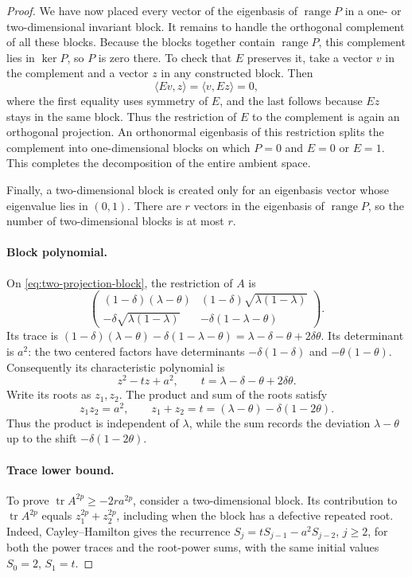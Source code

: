\documentclass[11pt]{article}
\theoremstyle{definition}
\theoremstyle{remark}
\theoremstyle{plain}
\DeclareMathOperator{\tr}{tr}
\begin{document}
\begin{proof}
We have now placed every vector of the eigenbasis of
\(\operatorname{range}P\) in a one- or two-dimensional invariant block.
It remains to handle the orthogonal complement of all these blocks.
Because the blocks together contain \(\operatorname{range}P\),
this complement lies in \(\ker P\), so \(P\) is zero there.
To check that \(E\) preserves it, take a vector \(v\) in the complement
and a vector \(z\) in any constructed block. Then
\[
 \langle Ev,z\rangle=\langle v,Ez\rangle=0,
\]
where the first equality uses symmetry of \(E\), and the last
follows because \(Ez\) stays in the same block.
Thus the restriction of \(E\) to the complement is again an
orthogonal projection. An orthonormal eigenbasis of this restriction
splits the complement into one-dimensional blocks on which \(P=0\)
and \(E=0\) or \(E=1\). This completes the decomposition of the
entire ambient space.

Finally, a two-dimensional block is created only for an eigenbasis
vector whose eigenvalue lies in \((0,1)\). There are \(r\) vectors
in the eigenbasis of \(\operatorname{range}P\), so the number of
two-dimensional blocks is at most \(r\).

\paragraph{Block polynomial.}
On \eqref{eq:two-projection-block}, the restriction of \(A\) is
\[
 \begin{pmatrix}
 (1-\delta)(\lambda-\theta)&
       (1-\delta)\sqrt{\lambda(1-\lambda)}\\
 -\delta\sqrt{\lambda(1-\lambda)}&
       -\delta(1-\lambda-\theta)
 \end{pmatrix}.
\]
Its trace is
\((1-\delta)(\lambda-\theta)-\delta(1-\lambda-\theta)
=\lambda-\delta-\theta+2\delta\theta\).
Its determinant is \(a^2\): the two centered factors have
determinants \(-\delta(1-\delta)\) and \(-\theta(1-\theta)\).
Consequently its characteristic polynomial is
\begin{equation}\label{eq:block-polynomial}
 z^2-tz+a^2,\qquad t=\lambda-\delta-\theta+2\delta\theta.
\end{equation}
Write its roots as \(z_1,z_2\). The product and sum of the roots satisfy
\[
 z_1z_2=a^2,\qquad
 z_1+z_2=t=(\lambda-\theta)-\delta(1-2\theta).
\]
Thus the product is independent of \(\lambda\), while the sum records
the deviation \(\lambda-\theta\) up to the shift
\(-\delta(1-2\theta)\).

\paragraph{Trace lower bound.}
To prove \(\tr A^{2p}\ge-2ra^{2p}\), consider a two-dimensional
block. Its contribution to \(\tr A^{2p}\) equals
\(z_1^{2p}+z_2^{2p}\), including when the block has a defective
repeated root. Indeed, Cayley--Hamilton gives the recurrence
\(S_j=tS_{j-1}-a^2S_{j-2}\), \(j\ge2\), for both the power traces
and the root-power sums, with the same initial values
\(S_0=2\), \(S_1=t\).


\end{proof}
\end{document}

